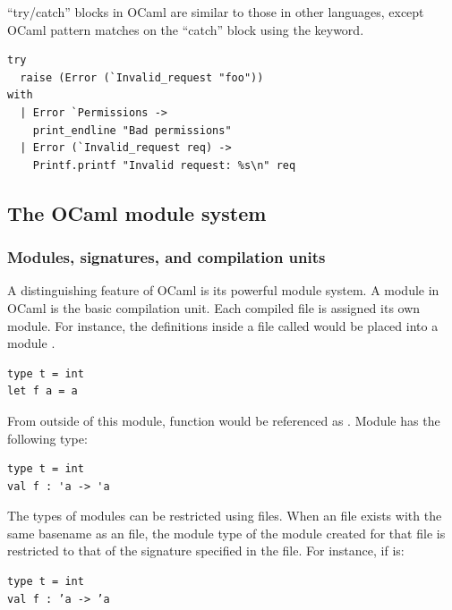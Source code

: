 ``try/catch'' blocks in OCaml are similar to those in other languages,
except OCaml pattern matches on the ``catch'' block using the
 keyword.

\begin{lstlisting}
try
  raise (Error (`Invalid_request "foo"))
with
  | Error `Permissions ->
    print_endline "Bad permissions"
  | Error (`Invalid_request req) ->
    Printf.printf "Invalid request: %s\n" req
\end{lstlisting}

\subsection{The OCaml module system}

\subsubsection{Modules, signatures, and compilation units}

A distinguishing feature of OCaml is its powerful module system. A
module in OCaml is the basic compilation unit. Each compiled file is
assigned its own module. For instance, the definitions inside a file
called  would be placed into a module .

\begin{lstlisting}
type t = int
let f a = a
\end{lstlisting}

From outside of this module, function  would be referenced as
. Module  has the following type:

\begin{lstlisting}
type t = int
val f : 'a -> 'a
\end{lstlisting}

The types of modules can be restricted using  files. When
an  file exists with the same basename as an  file,
the module type of the module created for that  file is
restricted to that of the signature specified in the 
file. For instance, if  is:

%
\begin{lstlisting}
type t = int
val f : ’a -> ’a
\end{lstlisting}

